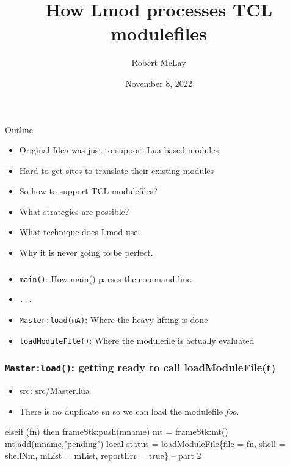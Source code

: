 \documentclass{beamer}
\begin{document}
\title[Lmod]{How Lmod processes TCL modulefiles}
\author{Robert McLay} 
\date{November 8, 2022}

\frame{\titlepage} 


\begin{frame}{Outline}
  \begin{itemize}
    \item Original Idea was just to support Lua based modules
    \item Hard to get sites to translate their existing modules
    \item So how to support TCL modulefiles?
    \item What strategies are possible?
    \item What technique does Lmod use
    \item Why it is never going to be perfect.
  \end{itemize}
\end{frame}

\begin{frame}[fragile]
    \frametitle{}
  \begin{itemize}
    \item \texttt{main()}: How main() parses the command line
    \item \texttt{...}
    \item \texttt{Master:load(mA)}: Where the heavy lifting is done
    \item \texttt{loadModuleFile()}: Where the modulefile is actually evaluated
  \end{itemize}
\end{frame}

\begin{frame}[fragile]
    \frametitle{\texttt{Master:load()}: getting ready to call loadModuleFile(t)}
  \begin{itemize}
    \item src: src/Master.lua
    \item There is no duplicate sn so we can load the modulefile {\color{blue}\emph{foo}}.
  \end{itemize}
 {\tiny
    \begin{semiverbatim}
elseif (fn) then
   frameStk:push(mname)
   mt = frameStk:mt()
   mt:add(mname,"pending")
   local status = loadModuleFile\{file = fn, shell = shellNm,
                   mList = mList, reportErr = true\}
   -- part 2

    \end{semiverbatim}
}
\end{frame}
\end{document}
